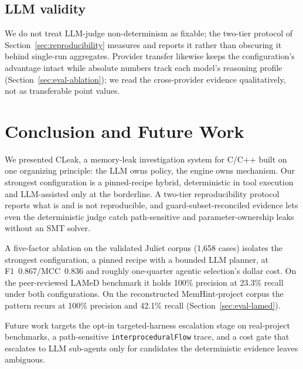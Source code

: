 \documentclass[a4paper]{llncs}
\begin{document}
\subsection{LLM validity}
We do not treat LLM-judge non-determinism as
fixable; the two-tier protocol of Section~\ref{sec:reproducibility}
measures and reports it rather than obscuring it behind single-run
aggregates. Provider transfer likewise keeps the configuration's
advantage intact while absolute numbers track each model's reasoning
profile (Section~\ref{sec:eval-ablation}); we read the cross-provider
evidence qualitatively, not as transferable point values.

\section{Conclusion and Future Work}

We presented CLeak, a memory-leak investigation system for C/C++ built
on one organizing principle: the LLM owns policy, the engine owns
mechanism. Our strongest configuration is a pinned-recipe hybrid,
deterministic in tool execution and LLM-assisted only at the
borderline. A two-tier reproducibility protocol
reports what is and is not reproducible, and guard-subset-reconciled
evidence lets even the deterministic judge catch path-sensitive and
parameter-ownership leaks without an SMT solver.

A five-factor ablation on the validated Juliet corpus (1{,}658 cases)
isolates the strongest configuration, a pinned recipe with a bounded
LLM planner, at
F1~0.867/MCC~0.836 and roughly one-quarter agentic selection's dollar
cost. On the peer-reviewed LAMeD benchmark it holds 100\% precision at
23.3\% recall under both configurations. On the reconstructed
MemHint-project corpus the pattern recurs at 100\% precision and
42.1\% recall (Section~\ref{sec:eval-lamed}).

Future work targets the opt-in targeted-harness escalation stage on
real-project benchmarks, a path-sensitive \texttt{interproceduralFlow}
trace, and a cost gate that escalates to LLM sub-agents only for
candidates the deterministic evidence leaves ambiguous.

\label{page:lastcontent}
\end{document}
